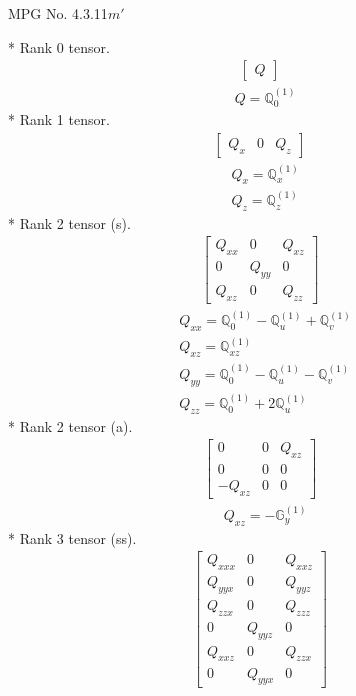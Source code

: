 \documentclass[fleqn,8pt,landscape]{jsarticle}
\begin{document}
\setcounter{MaxMatrixCols}{32}

\renewcommand{\tablename}{Table~}
\renewcommand{\figurename}{Figure~}
\begin{center}
\LARGE
MPG No. 4.3.11\quad$m'$
\end{center}
* Rank 0 tensor.
\begin{align*}
\begin{bmatrix} Q \end{bmatrix}
\end{align*}
\begin{align*}
& Q = \mathbb{Q}_{0}^{(1)}
\end{align*}
* Rank 1 tensor.
\begin{align*}
\begin{bmatrix} Q_{x} & 0 & Q_{z} \end{bmatrix}
\end{align*}
\begin{align*}
& Q_{x} = \mathbb{Q}_{x}^{(1)} \\
& Q_{z} = \mathbb{Q}_{z}^{(1)}
\end{align*}
* Rank 2 tensor (s).
\begin{align*}
\begin{bmatrix} Q_{xx} & 0 & Q_{xz} \\ 0 & Q_{yy} & 0 \\ Q_{xz} & 0 & Q_{zz} \end{bmatrix}
\end{align*}
\begin{align*}
& Q_{xx} = \mathbb{Q}_{0}^{(1)} - \mathbb{Q}_{u}^{(1)} + \mathbb{Q}_{v}^{(1)} \\
& Q_{xz} = \mathbb{Q}_{xz}^{(1)} \\
& Q_{yy} = \mathbb{Q}_{0}^{(1)} - \mathbb{Q}_{u}^{(1)} - \mathbb{Q}_{v}^{(1)} \\
& Q_{zz} = \mathbb{Q}_{0}^{(1)} + 2 \mathbb{Q}_{u}^{(1)}
\end{align*}
* Rank 2 tensor (a).
\begin{align*}
\begin{bmatrix} 0 & 0 & Q_{xz} \\ 0 & 0 & 0 \\ - Q_{xz} & 0 & 0 \end{bmatrix}
\end{align*}
\begin{align*}
& Q_{xz} = - \mathbb{G}_{y}^{(1)}
\end{align*}
* Rank 3 tensor (ss).
\begin{align*}
\begin{bmatrix} Q_{xxx} & 0 & Q_{xxz} \\ Q_{yyx} & 0 & Q_{yyz} \\ Q_{zzx} & 0 & Q_{zzz} \\ 0 & Q_{yyz} & 0 \\ Q_{xxz} & 0 & Q_{zzx} \\ 0 & Q_{yyx} & 0 \end{bmatrix}
\end{align*}
\end{document}
